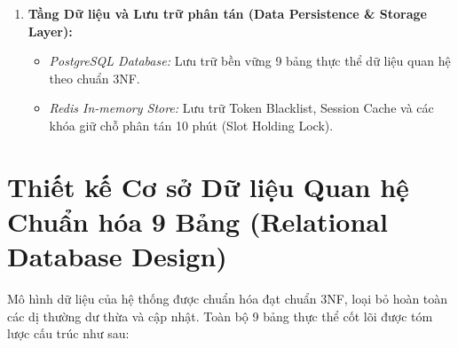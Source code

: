 \begin{enumerate}[label=\arabic*.]
\begin{itemize}
        \item \textit{RAG Chatbot Service (\texttt{chatbot\_service.py}):} Quản lý lịch sử hội thoại của người dùng, phân tích ý định (Intent Recognition), kích hoạt tìm kiếm vector ngữ nghĩa và tích hợp \texttt{EvidenceGate} để bảo đảm độ chính xác của câu trả lời.
        \item \textit{Bộ máy phân loại cấp bậc (\texttt{elo\_engine.py}):} Xử lý các phép tính xác suất kỳ vọng và cập nhật điểm số sau mỗi trận đấu thể thao.
    \end{itemize}
    \item \textbf{Tầng Dữ liệu và Lưu trữ phân tán (Data Persistence \& Storage Layer):}
    \begin{itemize}
        \item \textit{PostgreSQL Database:} Lưu trữ bền vững 9 bảng thực thể dữ liệu quan hệ theo chuẩn 3NF.
        \item \textit{Redis In-memory Store:} Lưu trữ Token Blacklist, Session Cache và các khóa giữ chỗ phân tán 10 phút (Slot Holding Lock).
    \end{itemize}
\end{enumerate}

\section{Thiết kế Cơ sở Dữ liệu Quan hệ Chuẩn hóa 9 Bảng (Relational Database Design)}
\label{sec:thietke_csdl_9bang}

Mô hình dữ liệu của hệ thống được chuẩn hóa đạt chuẩn 3NF, loại bỏ hoàn toàn các dị thường dư thừa và cập nhật. Toàn bộ 9 bảng thực thể cốt lõi được tóm lược cấu trúc như sau:

